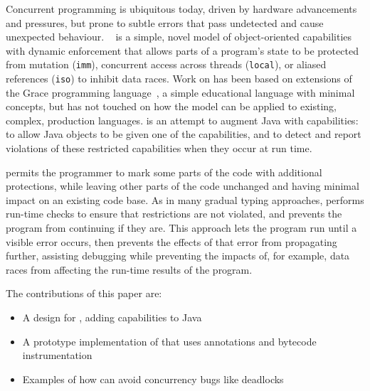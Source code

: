 \documentclass[JDala.tex]{subfiles}
\begin{document}

Concurrent programming is ubiquitous today, driven by hardware advancements
and pressures, but prone to subtle errors that pass undetected and cause
unexpected behaviour.
%
\dala~\cite{Dala_Paper,DafnyExperience-Noble2024} is a simple, novel model of object-oriented capabilities with dynamic
enforcement that allows parts of a program's state to be protected from
mutation (\texttt{imm}), concurrent access across threads (\texttt{local}),
or aliased references (\texttt{iso})
to inhibit data races.
%
Work on \dala has been based on extensions of the Grace programming
language~\cite{GraceAbsence-Black2012}, a simple educational language with
minimal concepts, but has not touched on how the model can be applied to
existing, complex, production languages.
%
\jdala is an attempt to augment Java with \dala capabilities:
%
to allow Java objects to be given one of the \dala capabilities,
and to detect and report violations of these restricted capabilities when
they occur at run time.

\jdala permits the programmer to mark some parts of the code with
additional protections, while leaving other parts of the code unchanged
and having minimal impact on an existing code base.
%
As in many gradual typing approaches, \jdala performs run-time checks to
ensure that restrictions are not violated, and prevents the program from
continuing if they are.
%
This approach lets the program run until a visible error occurs, then
prevents the effects of that error from propagating further, assisting
debugging while preventing the impacts of, for example, data races from
affecting the run-time results of the program.

The contributions of this paper are:
\begin{itemize}
  \item A design for \jdala, adding \dala capabilities to Java
  \item A prototype implementation of \jdala that uses annotations and bytecode instrumentation
  \item Examples of how \jdala can avoid concurrency bugs like deadlocks
\end{itemize}
\end{document}
